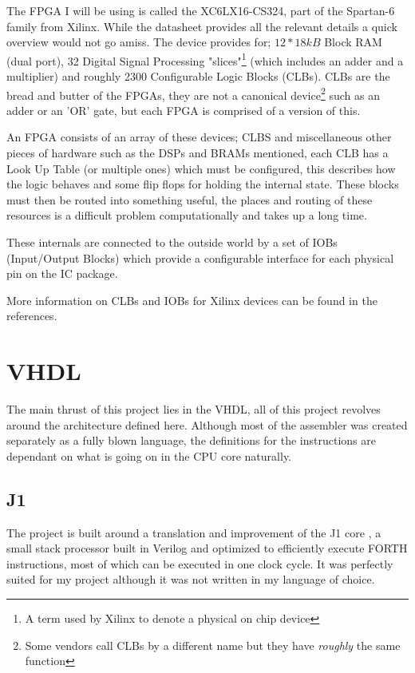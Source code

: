 \documentclass	[a4paper, 10pt]	{article}
\begin{document}
  The FPGA I will be using is called the XC6LX16-CS324, part of
  the Spartan-6 family from Xilinx\cite{xilinxDataSheet}. While the
  datasheet provides all the relevant details a quick overview would
  not go amiss. The device provides for; $12*18kB$ Block RAM (dual
  port), 32 Digital Signal Processing "slices"\footnote{A term used
  by Xilinx to denote a physical on chip device} (which includes an
  adder and a multiplier) and roughly 2300 Configurable Logic Blocks
  (CLBs). CLBs are the bread and butter of the FPGAs, they are not a
  canonical device\footnote{Some vendors call CLBs by a different name
  but they have \emph{roughly} the same function} such as an adder or an
  'OR' gate, but each FPGA is comprised of a version of this.

  An FPGA consists of an array of these devices; CLBS and miscellaneous
  other pieces of hardware such as the DSPs and BRAMs mentioned, each
  CLB has a Look Up Table (or multiple ones) which must be configured,
  this describes how the logic behaves and some flip flops for holding
  the internal state. These blocks must then be routed into something
  useful, the places and routing of these resources is a difficult
  problem computationally and takes up a long time.

  These internals are connected to the outside world by a set of IOBs
  (Input/Output Blocks) which provide a configurable interface for each
  physical pin on the IC package.

  More information on CLBs and IOBs for Xilinx devices can be found in
  the references\cite{CLB1}.

  
  \section{VHDL}

  The main thrust of this project lies in the VHDL, all of this project revolves around
  the architecture defined here. Although most of the assembler was created separately
  as a fully blown language, the definitions for the instructions are dependant on what 
  is going on in the CPU core naturally.

    \subsection{J1}
  
    The project is built around a translation and improvement of the J1 core \cite{j1core},
    a small stack processor built in Verilog and optimized to efficiently execute FORTH
    instructions, most of which can be executed in one clock cycle. It was perfectly suited
    for my project although it was not written in my language of choice.
\end{document}
